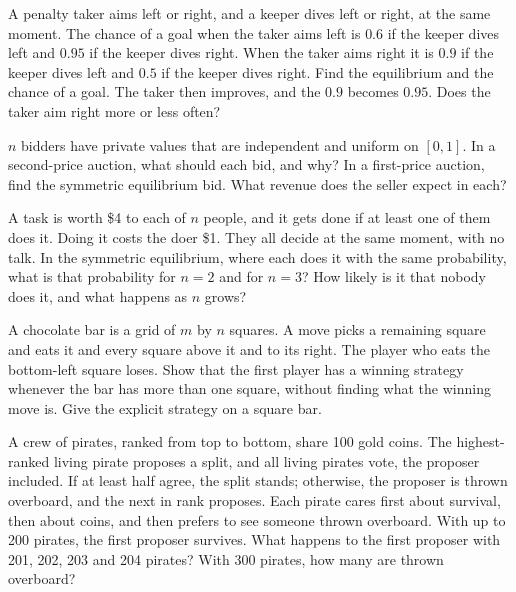 \begin{question}\label{iq:iv1:games:10}
A penalty taker aims left or right, and a keeper dives left or right, at the same moment. The chance of a goal when the taker aims left is $0.6$ if the keeper dives left and $0.95$ if the keeper dives right. When the taker aims right it is $0.9$ if the keeper dives left and $0.5$ if the keeper dives right. Find the equilibrium and the chance of a goal. The taker then improves, and the $0.9$ becomes $0.95$. Does the taker aim right more or less often?
\end{question}

\begin{question}\label{iq:iv1:games:11}
$n$ bidders have private values that are independent and uniform on $[0, 1]$. In a second-price auction, what should each bid, and why? In a first-price auction, find the symmetric equilibrium bid. What revenue does the seller expect in each?
\end{question}

\begin{question}\label{iq:iv1:games:12}
A task is worth \$4 to each of $n$ people, and it gets done if at least one of them does it. Doing it costs the doer \$1. They all decide at the same moment, with no talk. In the symmetric equilibrium, where each does it with the same probability, what is that probability for $n = 2$ and for $n = 3$? How likely is it that nobody does it, and what happens as $n$ grows?
\end{question}

\begin{question}\label{iq:iv1:games:13}
A chocolate bar is a grid of $m$ by $n$ squares. A move picks a remaining square and eats it and every square above it and to its right. The player who eats the bottom-left square loses. Show that the first player has a winning strategy whenever the bar has more than one square, without finding what the winning move is. Give the explicit strategy on a square bar.
\end{question}

\begin{question}\label{iq:iv1:games:14}
A crew of pirates, ranked from top to bottom, share 100 gold coins. The highest-ranked living pirate proposes a split, and all living pirates vote, the proposer included. If at least half agree, the split stands; otherwise, the proposer is thrown overboard, and the next in rank proposes. Each pirate cares first about survival, then about coins, and then prefers to see someone thrown overboard. With up to 200 pirates, the first proposer survives. What happens to the first proposer with 201, 202, 203 and 204 pirates? With 300 pirates, how many are thrown overboard?
\end{question}

